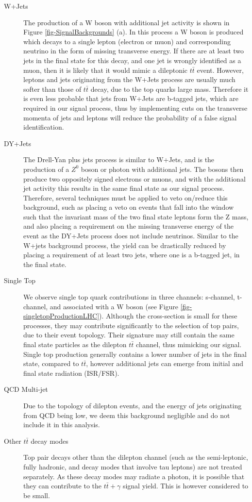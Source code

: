 \begin{description}
	\item[W+Jets] The production of a W boson with additional jet activity is shown in Figure \ref{fig-SignalBackgrounds} (a). In this process a W boson is produced which decays to a single lepton (electron or muon) and corresponding neutrino in the form of missing transverse energy. If there are at least two jets in the final state for this decay, and one jet is wrongly identified as a muon, then it is likely that it would mimic a dileptonic $t\bar{t}$ event. However, leptons and jets originating from the W+Jets process are usually much softer than those of $t\bar{t}$ decay, due to the top quarks large mass. Therefore it is even less probable that jets from W+Jets are b-tagged jets, which are required in our signal process, thus by implementing cuts on the transverse momenta of jets and leptons will reduce the probability of a false signal identification.  
	\item[DY+Jets] The Drell-Yan plus jets process is similar to W+Jets, and is the production of a $Z^0$ boson or photon with additional jets. The bosons then produce two oppositely signed electrons or muons, and with the additional jet activity this results in the same final state as our signal process. Therefore, several techniques must be applied to veto on/reduce this background, such as placing a veto on events that fall into the window such that the invariant mass of the two final state leptons form the Z mass, and also placing a requirement on the missing transverse energy of the event as the DY+Jets process does not include neutrinos. Similar to the W+jets background process, the yield can be drastically reduced by placing a requirement of at least two jets, where one is a b-tagged jet, in the final state. 
	\item[Single Top] We observe single top quark contributions in three channels: s-channel, t-channel, and associated with a W boson (see Figure \ref{fig-singletopProductionLHC}). Although the cross-section is small for these processes, they may contribute significantly to the selection of top pairs, due to their event topology. Their signature may still contain the same final state particles as the dilepton $t\bar{t}$ channel, thus mimicking our signal. Single top production generally contains a lower number of jets in the final state, compared to $t\bar{t}$, however additional jets can emerge from initial and final state radiation (ISR/FSR).  
	\item[QCD Multi-jet] Due to the topology of dilepton events, and the energy of jets originating from QCD being low, we deem this background negligible and do not include it in this analysis. 
	\item[Other $t\bar{t}$ decay modes] Top pair decays other than the dilepton channel (such as the semi-leptonic, fully hadronic, and decay modes that involve tau leptons) are not treated separately. As these decay modes may radiate a photon, it is possible that they can contribute to the $t\bar{t}+\gamma$ signal yield. This is however considered to be small.  
\end{description}

